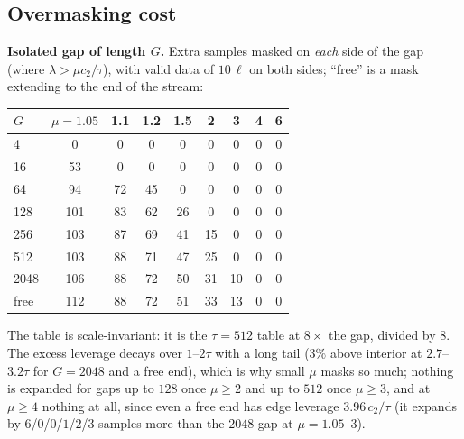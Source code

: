 \documentclass{article}
\numberwithin{equation}{section}   %
\begin{document}
\subsection{Overmasking cost}
\label{sec:ip_overmask}

{\bf Isolated gap of length $G$.}  Extra samples masked on {\em each} side of the gap (where
$\lambda > \mu c_2/\tau$), with valid data of $10\,\ell$ on both sides; ``free'' is a mask extending to
the end of the stream:
\begin{center}\small
\begin{tabular}{lcccccccc}
\toprule
$G$ & $\mu = 1.05$ & 1.1 & 1.2 & 1.5 & 2 & 3 & 4 & 6 \\
\midrule
4     & 0   & 0  & 0  & 0  & 0  & 0  & 0 & 0 \\
16    & 53  & 0  & 0  & 0  & 0  & 0  & 0 & 0 \\
64    & 94  & 72 & 45 & 0  & 0  & 0  & 0 & 0 \\
128   & 101 & 83 & 62 & 26 & 0  & 0  & 0 & 0 \\
256   & 103 & 87 & 69 & 41 & 15 & 0  & 0 & 0 \\
512   & 103 & 88 & 71 & 47 & 25 & 0  & 0 & 0 \\
2048  & 106 & 88 & 72 & 50 & 31 & 10 & 0 & 0 \\
free  & 112 & 88 & 72 & 51 & 33 & 13 & 0 & 0 \\
\bottomrule
\end{tabular}
\end{center}
The table is scale-invariant: it is the $\tau = 512$ table at $8\times$ the gap, divided by $8$.  The
excess leverage decays over $1$--$2\tau$ with a long tail ($3\%$ above interior at $2.7$--$3.2\tau$ for
$G = 2048$ and a free end), which is why small $\mu$ masks so much; nothing is expanded for gaps up to
$128$ once $\mu \ge 2$ and up to $512$ once $\mu \ge 3$, and at $\mu \ge 4$ nothing at all, since even a
free end has edge leverage $3.96\,c_2/\tau$ (it expands by $6$/$0$/$0$/$1$/$2$/$3$ samples more than the
$2048$-gap at $\mu = 1.05$--$3$).
\end{document}
